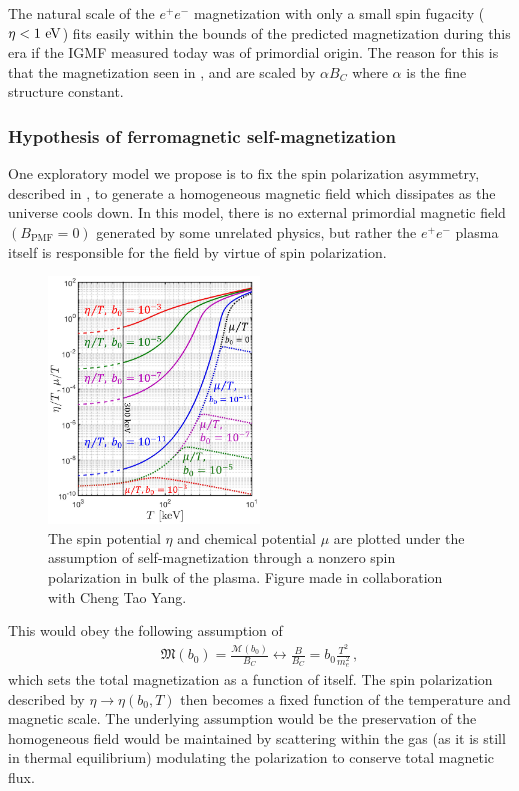 The natural scale of the $e^{+}e^{-}$ magnetization with only a small spin fugacity ($\eta<1\text{ eV}$) fits easily within the bounds of the predicted magnetization during this era if the IGMF measured today was of primordial origin. The reason for this is that the magnetization seen in ,  and  are scaled by $\alpha{B}_{C}$ where $\alpha$ is the fine structure constant.

\subsubsection{Hypothesis of ferromagnetic self-magnetization}
\label{sec:self}
\noindent One exploratory model we propose is to fix the spin polarization asymmetry, described in , to generate a homogeneous magnetic field which dissipates as the universe cools down. In this model, there is no external primordial magnetic field $({B}_\mathrm{PMF}=0)$ generated by some unrelated physics, but rather the $e^{+}e^{-}$ plasma itself is responsible for the field by virtue of spin polarization.

\begin{figure}[ht]
 \centering
 \includegraphics[width=0.5\textwidth]{plots/chap04cosmo/Spinchemical_03.png}
 \caption{The spin potential $\eta$ and chemical potential $\mu$ are plotted under the assumption of self-magnetization through a nonzero spin polarization in bulk of the plasma. Figure made in collaboration with Cheng Tao Yang.}
 \label{fig:self} 
\end{figure}

This would obey the following assumption of
\begin{align}
 \label{selfmag}
 {\mathfrak M}(b_{0})=\frac{\mathcal{M}(b_0)}{{B}_{C}}\longleftrightarrow\frac{B}{{B}_{C}}=b_{0}\frac{T^{2}}{m_{e}^{2}}\,,
\end{align}
which sets the total magnetization as a function of itself. The spin polarization described by $\eta\rightarrow\eta(b_{0},T)$ then becomes a fixed function of the temperature and magnetic scale. The underlying assumption would be the preservation of the homogeneous field would be maintained by scattering within the gas (as it is still in thermal equilibrium) modulating the polarization to conserve total magnetic flux.

